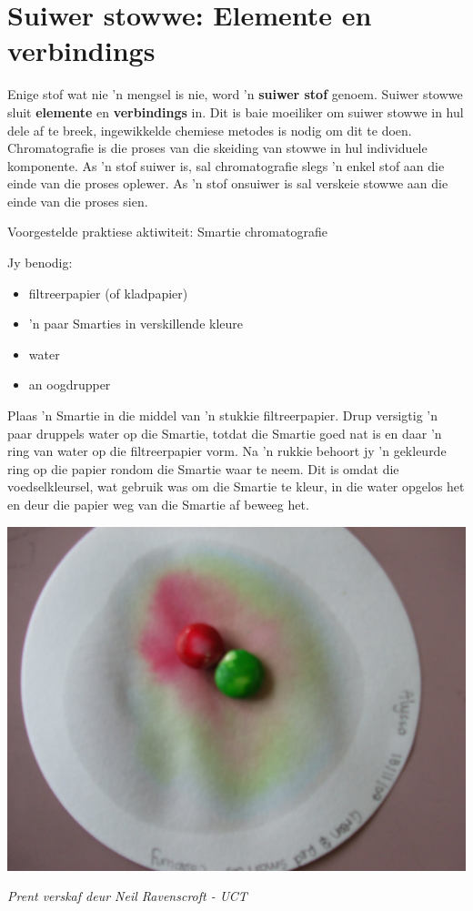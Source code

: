             \section{Suiwer stowwe: Elemente en verbindings}
            \nopagebreak
      \label{m38708*id63273}Enige stof wat nie 'n mengsel is nie, word 'n \textbf{suiwer stof} genoem. Suiwer stowwe sluit \textbf{elemente} en \textbf{verbindings} in. Dit is baie moeiliker om suiwer stowwe in hul dele af te breek, ingewikkelde chemiese metodes is nodig om dit te doen. Chromatografie is die proses van die skeiding van stowwe in hul individuele komponente. As 'n stof suiwer is, sal chromatografie slegs 'n enkel stof aan die einde van die proses oplewer. As 'n stof onsuiwer is sal verskeie stowwe aan die einde van die proses sien.\par 
\begin{activity}{Voorgestelde praktiese aktiwiteit: Smartie chromatografie}{
Jy benodig:
\begin{itemize}[noitemsep]
\item filtreerpapier (of kladpapier)
\item 'n paar Smarties in verskillende kleure
\item water
\item an oogdrupper
\end{itemize}
\begin{minipage}{.5\textwidth}
Plaas 'n Smartie in die middel van 'n stukkie filtreerpapier. Drup versigtig 'n paar druppels water op die Smartie, totdat die Smartie goed nat is en daar 'n ring van water op die filtreerpapier vorm. Na 'n rukkie behoort jy 'n gekleurde ring op die papier rondom die Smartie waar te neem. Dit is omdat die voedselkleursel, wat gebruik was om die Smartie te kleur, in die water opgelos het en deur die papier weg van die Smartie af beweeg het.
\end{minipage}
\begin{minipage}{.5\textwidth}
\begin{center}
 \includegraphics[width=.8\textwidth]{photos/smartie2.jpg}\par
\textit{Prent verskaf deur Neil Ravenscroft - UCT}
\end{center}
\end{minipage}
}
\end{activity}
\par 
	\par
      \label{m38708*uid25}
